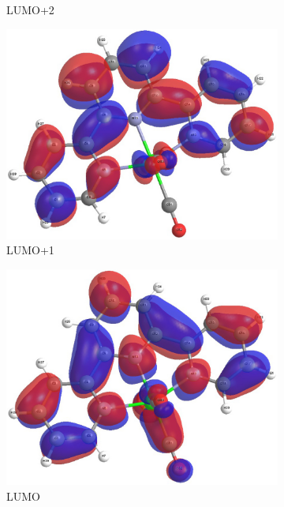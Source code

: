 \begin{figure}[!ht]
\begin{subfigure}[b]{0.31\textwidth}
  \caption{LUMO+2}
 \end{subfigure}
  \begin{subfigure}[b]{0.31\textwidth}
  \includegraphics[clip=true, width=\textwidth, keepaspectratio]{images/mos/2l+1.eps}
  \caption{LUMO+1}
 \end{subfigure}
  \begin{subfigure}[b]{0.31\textwidth}
  \includegraphics[clip=true, width=\textwidth, keepaspectratio]{images/mos/2l.eps}
  \caption{LUMO}
 \end{subfigure}
 \begin{subfigure}[b]{0.31\textwidth}

\end{subfigure}
\end{figure}
